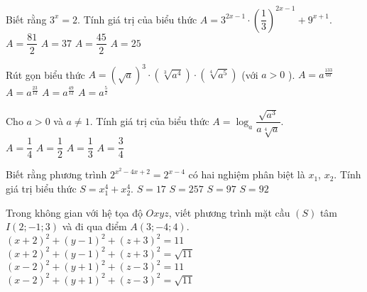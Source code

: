 \begin{ex}%
	Biết rằng $3^x=2$. Tính giá trị của biểu thức $A=3^{2x-1}\cdot{\left(\dfrac{1}{3}\right)}^{2x-1}+9^{x+1}$.
	\choice
	{$A=\dfrac{81}{2}$}
	{\True $A=37$}
	{$A=\dfrac{45}{2}$}
	{$A=25$}
\end{ex}
\begin{ex}%
	Rút gọn biểu thức $A={\left(\sqrt{a}\right)}^3\cdot\left(\sqrt[3]{a^4}\right)\cdot\left(\sqrt[4]{a^5}\right)$ (với $a>0$ ).
	\choice
	{$A=a^{\tfrac{133}{60}}$}
	{$A=a^{\tfrac{23}{12}}$}
	{\True $A=a^{\tfrac{49}{12}}$}
	{$A=a^{\tfrac{5}{2}}$}
\end{ex}
\begin{ex}%
	Cho $a>0$ và $a \ne 1$. Tính giá trị của biểu thức $A=\log _a\dfrac{\sqrt{a^3}}{a\sqrt[4]{a}}$. \\
	\choice
	{\True $A=\dfrac{1}{4}$}
	{ $A=\dfrac{1}{2}$}
	{$A=\dfrac{1}{3}$}
	{$A=\dfrac{3}{4}$}
\end{ex}
\begin{ex}%
	Biết rằng phương trình $2^{x^2-4x+2}=2^{x-4}$ có hai nghiệm phân biệt là $x_1$, $x_2$. Tính giá trị biểu thức $S=x_1^4+x_2^4$.
	\choice
	{$S=17$}
	{$S=257$}
	{\True $S=97$}
	{$S=92$}
\end{ex}
\begin{ex}%
	Trong không gian với hệ tọa độ $Oxyz$, viết phương trình mặt cầu $(S)$ tâm $I(2;-1;3)$ và đi qua điểm $A(3;-4;4)$.
	\choice
	{$(x+2)^2+(y-1)^2+(z+3)^2=11$}
	{$(x+2)^2+(y-1)^2+(z+3)^2=\sqrt{11}$}
	{\True $(x-2)^2+(y+1)^2+(z-3)^2=11$}
	{$(x-2)^2+(y+1)^2+(z-3)^2=\sqrt{11}$}
\end{ex}

